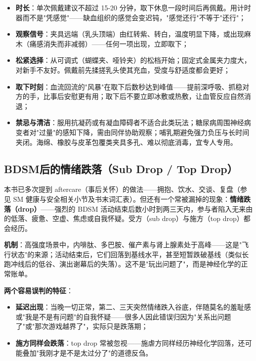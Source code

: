 \documentclass[12pt,UTF8]{ctexbook}
\begin{document}
\begin{itemize}
\item \textbf{时长}：单次佩戴建议不超过 15-20 分钟，取下休息一段时间后再佩戴。用计时器而不是"凭感觉"——缺血组织的感觉会变迟钝，"感觉还行"不等于"还行"；
\item \textbf{观察信号}：夹具远端（乳头顶端）由红转紫、转白，温度明显下降，或出现麻木（痛感消失而非减弱）——任何一项出现，立即取下；
\item \textbf{松紧选择}：从可调式（蝴蝶夹、哑铃夹）的松档开始；固定式金属夹力度大，对新手不友好。佩戴前先揉搓乳头使其充血，受度与舒适度都会更好；
\item \textbf{取下时刻}：血流回流的"风暴"在取下后数秒达到峰值——提前深呼吸、抓稳对方的手，比事后安慰更有用；取下后不要立即冰敷或热敷，让血管反应自然消退；
\item \textbf{禁忌与清洁}：服用抗凝药或有凝血障碍者不适合此类玩法；糖尿病周围神经病变者对"过量"的感知下降，需由同伴协助观察；哺乳期避免强力负压与长时间夹闭。海绵、橡胶与皮革包覆类夹具多孔、难以彻底消毒，宜专人专用。
\end{itemize}

\subsection{BDSM后的情绪跌落（Sub Drop / Top Drop）}\label{sec:drop}

本书已多次提到 aftercare（事后关怀）的做法——拥抱、饮水、交谈、复盘（参见 SM 健康与安全相关小节及书末词汇表）。但还有一个常被漏掉的现象：\textbf{情绪跌落（drop）}——强烈的 BDSM 活动结束后数小时到两三天内，参与者陷入无来由的低落、疲惫、空虚、焦虑或自我怀疑。受方（sub drop）与施方（top drop）都会经历。

\textbf{机制}：高强度场景中，内啡肽、多巴胺、催产素与肾上腺素处于高峰——这是"飞行状态"的来源；活动结束后，它们回落到基线水平，甚至短暂跌破基线（类似长跑冲线后的低谷、演出谢幕后的失落）。这不是"玩出问题了"，而是神经化学的正常账单。

\textbf{两个容易误判的特征}：
\begin{itemize}
\item \textbf{延迟出现}：当晚一切正常，第二、三天突然情绪跌入谷底，伴随莫名的羞耻感或"我是不是有问题"的自我怀疑——很多人因此错误归因为"关系出问题了"或"那次游戏越界了"，实际只是跌落期；
\item \textbf{施方同样会跌落}：top drop 常被忽视——施虐方同样经历神经化学回落，还可能叠加"我刚才是不是太过分了"的道德反刍。
\end{itemize}
\end{document}
